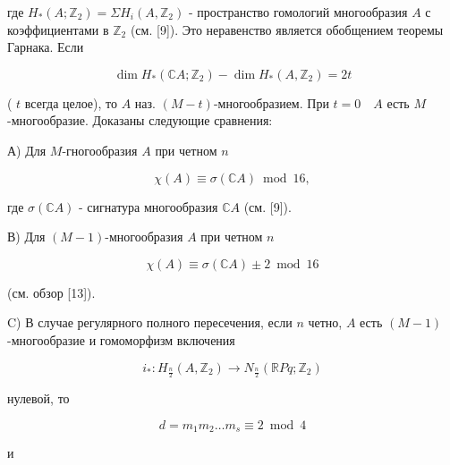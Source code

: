 \documentclass[10pt]{article}
\begin{document}
где $H_{*}\left(A ; \mathbb{Z}_{2}\right)=\Sigma H_{i}\left(A, \mathbb{Z}_{2}\right)$ - пространство гомологий многообразия $A$ с коэффициентами в $\mathbb{Z}_{2}$ (см. [9]). Это неравенство является обобщением теоремы Гарнака. Если



\[

\operatorname{dim} H_{*}\left(\mathbb{C} A ; \mathbb{Z}_{2}\right)-\operatorname{dim} H_{*}\left(A, \mathbb{Z}_{2}\right)=2 t

\]



( $t$ всегда целое), то $A$ наз. $(M-t)$-многообразием. При $t=0 \quad A$ есть $M$-многообразие. Доказаны следующие сравнения:



А) Для $M$-гногообразия $A$ при четном $n$



\[

\chi(A) \equiv \sigma(\mathbb{C} A) \bmod 16,

\]



где $\sigma(\mathbb{C} A)$ - сигнатура многообразия $\mathbb{C} A$ (см. [9]).



В) Для $(M-1)$-многообразия $A$ при четном $n$



\[

\chi(A) \equiv \sigma(\mathbb{C} A) \pm 2 \bmod 16

\]



(см. обзор [13]).



C) В случае регулярного полного пересечения, если $n$ четно, $A$ есть $(M-1)$-многообразие и гомоморфизм включения



\[

i_{*}: H_{\frac{n}{2}}\left(A, \mathbb{Z}_{2}\right) \rightarrow N_{\frac{n}{2}}\left(\mathbb{R} P q ; \mathbb{Z}_{2}\right)

\]



нулевой, то



\[

d=m_{1} m_{2} \ldots m_{s} \equiv 2 \bmod 4

\]



и
\end{document}
